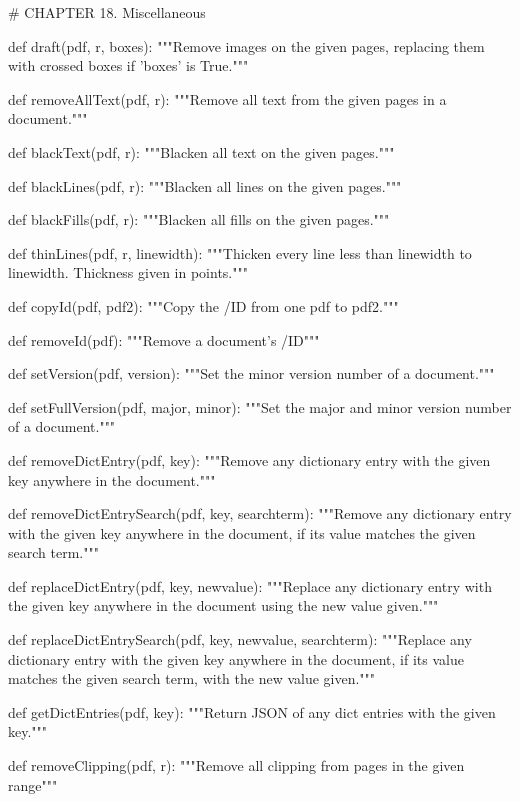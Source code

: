# CHAPTER 18. Miscellaneous

def draft(pdf, r, boxes):
    """Remove images on the given pages, replacing
    them with crossed boxes if 'boxes' is True."""

def removeAllText(pdf, r):
    """Remove all text from the given pages in a document."""

def blackText(pdf, r):
    """Blacken all text on the given pages."""

def blackLines(pdf, r):
    """Blacken all lines on the given pages."""

def blackFills(pdf, r):
    """Blacken all fills on the given pages."""

def thinLines(pdf, r, linewidth):
    """Thicken every line less than
    linewidth to linewidth. Thickness given in points."""

def copyId(pdf, pdf2):
    """Copy the /ID from one pdf to pdf2."""

def removeId(pdf):
    """Remove a document's /ID"""

def setVersion(pdf, version):
    """Set the minor version number of a document."""

def setFullVersion(pdf, major, minor):
    """Set the major and minor version number of
    a document."""

def removeDictEntry(pdf, key):
    """Remove any dictionary entry with the given
    key anywhere in the document."""

def removeDictEntrySearch(pdf, key, searchterm):
    """Remove any dictionary entry with the given
    key anywhere in the document, if its value matches the given search term."""

def replaceDictEntry(pdf, key, newvalue):
    """Replace any dictionary entry with the given
    key anywhere in the document using the new value given."""

def replaceDictEntrySearch(pdf, key, newvalue, searchterm):
    """Replace any dictionary entry with the given key anywhere in the
    document, if its value matches the given search term, with the new value
    given."""

def getDictEntries(pdf, key):
    """Return JSON of any dict entries with the given key."""

def removeClipping(pdf, r):
    """Remove all clipping from pages in the given range"""
